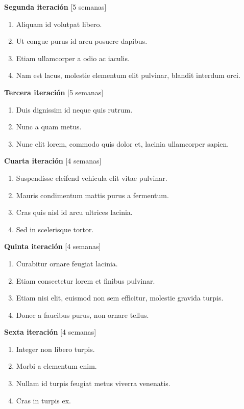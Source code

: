 \documentclass[a4paper, 10pt, twoside]{article}
\begin{document}
\textbf{Segunda iteración} [5 semanas]
\begin{enumerate}
\item Aliquam id volutpat libero.
\item Ut congue purus id arcu posuere dapibus.
\item Etiam ullamcorper a odio ac iaculis.
\item Nam est lacus, molestie elementum elit pulvinar, blandit interdum orci.
\end{enumerate}

\textbf{Tercera iteración} [5 semanas]
\begin{enumerate}
\item Duis dignissim id neque quis rutrum.
\item Nunc a quam metus.
\item Nunc elit lorem, commodo quis dolor et, lacinia ullamcorper sapien.
\end{enumerate}

\textbf{Cuarta iteración} [4 semanas]
\begin{enumerate}
\item Suspendisse eleifend vehicula elit vitae pulvinar.
\item Mauris condimentum mattis purus a fermentum.
\item Cras quis nisl id arcu ultrices lacinia.
\item Sed in scelerisque tortor.
\end{enumerate}

\textbf{Quinta iteración} [4 semanas]
\begin{enumerate}
\item Curabitur ornare feugiat lacinia.
\item Etiam consectetur lorem et finibus pulvinar.
\item Etiam nisi elit, euismod non sem efficitur, molestie gravida turpis.
\item Donec a faucibus purus, non ornare tellus.
\end{enumerate}

\textbf{Sexta iteración} [4 semanas]
\begin{enumerate}
\item Integer non libero turpis.
\item Morbi a elementum enim.
\item Nullam id turpis feugiat metus viverra venenatis.
\item Cras in turpis ex.
\end{enumerate}
\end{document}
